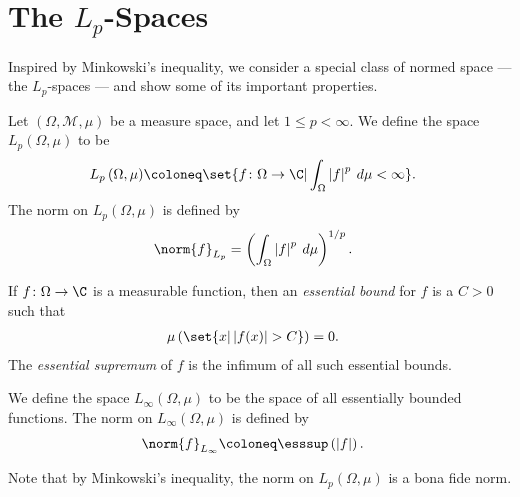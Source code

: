 \documentclass[10pt]{mypackage}
\begin{document}
\section{The $L_p$-Spaces}%
Inspired by Minkowski's inequality, we consider a special class of normed space --- the $L_p$-spaces --- and show some of its important properties.
\begin{definition}
  Let $\left( \Omega,\mathcal{M},\mu \right)$ be a measure space, and let $1 \leq p < \infty$. We define the space $L_p\left( \Omega,\mu \right)$ to be
  \begin{align*}
    L_p\left( \Omega,\mu \right) &\coloneq \set{f\colon \Omega\rightarrow \C | \int_{\Omega}^{} \left\vert f \right\vert^{p}\:d\mu < \infty}.
  \end{align*}
  The norm on $L_p\left( \Omega,\mu \right)$ is defined by
  \begin{align*}
    \norm{f}_{L_p} &= \left( \int_{\Omega}^{} \left\vert f \right\vert^{p}\:d\mu \right)^{1/p}.
  \end{align*}
\end{definition}
\begin{definition}
  If $f\colon \Omega\rightarrow \C$ is a measurable function, then an \textit{essential bound} for $f$ is a $C > 0$ such that
  \begin{align*}
    \mu\left( \set{x | \left\vert f(x) \right\vert > C} \right) &= 0.
  \end{align*}
  The \textit{essential supremum} of $f$ is the infimum of all such essential bounds.\newline

  We define the space $L_{\infty}\left( \Omega,\mu \right)$ to be the space of all essentially bounded functions. The norm on $L_{\infty}\left( \Omega,\mu \right)$ is defined by
  \begin{align*}
    \norm{f}_{L_{\infty}} &\coloneq \esssup\left( \left\vert f \right\vert \right).
  \end{align*}
\end{definition}

Note that by Minkowski's inequality, the norm on $L_p\left( \Omega,\mu \right)$ is a bona fide norm.\newline
\end{document}

